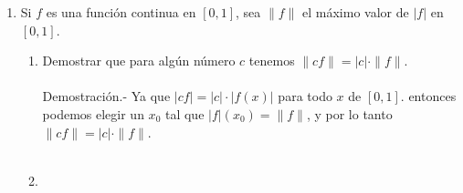 \begin{enumerate}
\begin{enumerate}[\bfseries (a)]
    \end{enumerate}

\item Si $f$ es una función continua en $[0,1]$, sea $\|f\|$ el máximo valor de $|f|$ en $[0,1]$.

    \begin{enumerate}[\bfseries (a)]

	\item Demostrar que para algún número $c$ tenemos $\|cf\| = |c|\cdot \|f\|$.\\\\
	    Demostración.-\; Ya que $|cf|=|c|\cdot |f(x)|$ para todo $x$ de $[0,1].$ entonces podemos elegir un $x_0$ tal que $|f|(x_0)=\|f\|$, y por lo tanto $\|cf\| = |c|\cdot \|f\|$.\\\\

	\item 

    \end{enumerate}

\end{enumerate}
